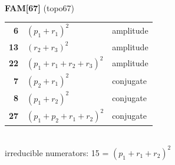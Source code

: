 \documentclass[10pt]{article}
\begin{document}
\begin{minipage}[t]{0.48\textwidth}
{}\\[2mm]\textbf{FAM[67]} (topo67)\\[2pt]{\footnotesize\begin{tabular}{@{}r@{\ \ }l@{\ \ }l@{}}\textbf{6} & $(p_1+r_1)^2$ & amplitude\\
\textbf{13} & $(r_2+r_3)^2$ & amplitude\\
\textbf{22} & $(p_1+r_1+r_2+r_3)^2$ & amplitude\\
\textbf{7} & $(p_2+r_1)^2$ & conjugate\\
\textbf{8} & $(p_1+r_2)^2$ & conjugate\\
\textbf{27} & $(p_1+p_2+r_1+r_2)^2$ & conjugate\\\end{tabular}}\\[2pt]{\scriptsize irreducible numerators: 15 = $(p_1+r_1+r_2)^2$}\end{minipage}

\bigskip
\end{document}
